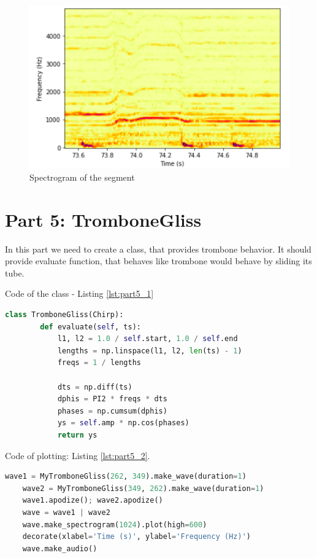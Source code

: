 \documentclass[a4paper]{article}
\begin{document}
            \begin{figure}[H]
                \centering
                \includegraphics[width=\textwidth]{img/yoasobi_spec2.png}
                \caption{Spectrogram of the segment}
                \label{fig:part42}
            \end{figure}
            
    \newpage
        \section{Part 5: TromboneGliss}
        
            In this part we need to create a class, that provides trombone behavior. It should provide evaluate function, that behaves like trombone would behave by sliding its tube.
            
            Code of the class - Listing \ref{lst:part5_1}
            
            \begin{lstlisting}[language=Python,caption=Definition of the class,label={lst:part5_1}]
    class TromboneGliss(Chirp):
        def evaluate(self, ts):
            l1, l2 = 1.0 / self.start, 1.0 / self.end
            lengths = np.linspace(l1, l2, len(ts) - 1)
            freqs = 1 / lengths
            
            dts = np.diff(ts)
            dphis = PI2 * freqs * dts
            phases = np.cumsum(dphis)
            ys = self.amp * np.cos(phases)
            return ys
            \end{lstlisting}
            
            Code of plotting: Listing \ref{lst:part5_2}.
            
            \begin{lstlisting}[language=Python,caption=Class usage,label={lst:part5_2}]
    wave1 = MyTromboneGliss(262, 349).make_wave(duration=1)
    wave2 = MyTromboneGliss(349, 262).make_wave(duration=1)
    wave1.apodize(); wave2.apodize()
    wave = wave1 | wave2
    wave.make_spectrogram(1024).plot(high=600)
    decorate(xlabel='Time (s)', ylabel='Frequency (Hz)')
    wave.make_audio()
            \end{lstlisting}
            
\end{document}
